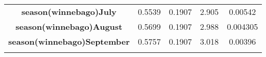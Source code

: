 \documentclass[]{book}
\theoremstyle{definition}
\theoremstyle{definition}
\theoremstyle{remark}
\begin{document}
\begin{longtable}[c]{@{}ccccc@{}}
\begin{minipage}[t]{0.37\columnwidth}\centering\strut
\textbf{season(winnebago)July}
\strut\end{minipage} &
\begin{minipage}[t]{0.12\columnwidth}\centering\strut
0.5539
\strut\end{minipage} &
\begin{minipage}[t]{0.14\columnwidth}\centering\strut
0.1907
\strut\end{minipage} &
\begin{minipage}[t]{0.11\columnwidth}\centering\strut
2.905
\strut\end{minipage} &
\begin{minipage}[t]{0.11\columnwidth}\centering\strut
0.00542
\strut\end{minipage}\tabularnewline
\begin{minipage}[t]{0.37\columnwidth}\centering\strut
\textbf{season(winnebago)August}
\strut\end{minipage} &
\begin{minipage}[t]{0.12\columnwidth}\centering\strut
0.5699
\strut\end{minipage} &
\begin{minipage}[t]{0.14\columnwidth}\centering\strut
0.1907
\strut\end{minipage} &
\begin{minipage}[t]{0.11\columnwidth}\centering\strut
2.988
\strut\end{minipage} &
\begin{minipage}[t]{0.11\columnwidth}\centering\strut
0.004305
\strut\end{minipage}\tabularnewline
\begin{minipage}[t]{0.37\columnwidth}\centering\strut
\textbf{season(winnebago)September}
\strut\end{minipage} &
\begin{minipage}[t]{0.12\columnwidth}\centering\strut
0.5757
\strut\end{minipage} &
\begin{minipage}[t]{0.14\columnwidth}\centering\strut
0.1907
\strut\end{minipage} &
\begin{minipage}[t]{0.11\columnwidth}\centering\strut
3.018
\strut\end{minipage} &
\begin{minipage}[t]{0.11\columnwidth}\centering\strut
0.00396
\strut\end{minipage}\tabularnewline
\begin{minipage}[t]{0.37\columnwidth}\centering\strut

\end{minipage}
\end{longtable}
\end{document}

